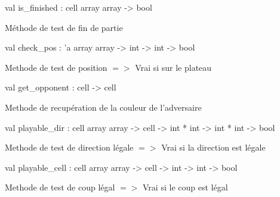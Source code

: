 \documentclass[11pt]{article}
\begin{document}
\label{val:Othello.is-underscorefinished}\begin{ocamldoccode}
val is_finished : cell array array -> bool
\end{ocamldoccode}
\begin{ocamldocdescription}
Méthode de test de fin de partie


\end{ocamldocdescription}




\label{val:Othello.check-underscorepos}\begin{ocamldoccode}
val check_pos : 'a array array -> int -> int -> bool
\end{ocamldoccode}
\begin{ocamldocdescription}
Methode de test de position $=$$>$ Vrai si sur le plateau


\end{ocamldocdescription}




\label{val:Othello.get-underscoreopponent}\begin{ocamldoccode}
val get_opponent : cell -> cell
\end{ocamldoccode}
\begin{ocamldocdescription}
Methode de recupération de la couleur de l'adversaire


\end{ocamldocdescription}




\label{val:Othello.playable-underscoredir}\begin{ocamldoccode}
val playable_dir : cell array array -> cell -> int * int -> int * int -> bool
\end{ocamldoccode}
\begin{ocamldocdescription}
Methode de test de direction légale $=$$>$ Vrai si la direction est légale


\end{ocamldocdescription}




\label{val:Othello.playable-underscorecell}\begin{ocamldoccode}
val playable_cell : cell array array -> cell -> int -> int -> bool
\end{ocamldoccode}
\begin{ocamldocdescription}
Methode de test de coup légal $=$$>$ Vrai si le coup est légal


\end{ocamldocdescription}
\end{document}
